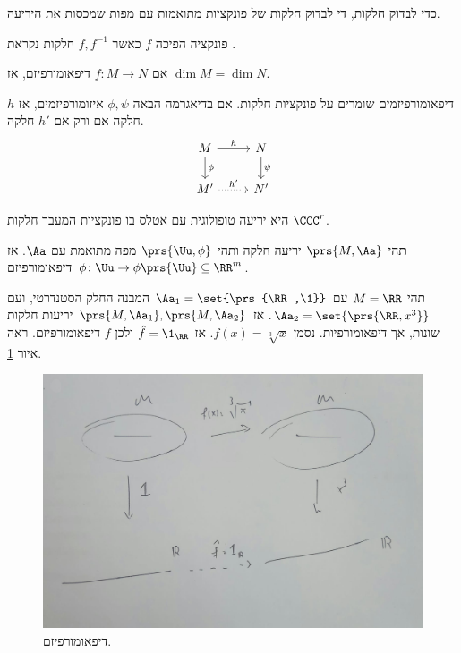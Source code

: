 \documentclass[a4paper,10pt,twoside,openany]{book}
\begin{document}
\begin{remark}
כדי לבדוק חלקות, די לבדוק חלקות של פונקציות מתואמות עם מפות שמכסות את היריעה.
\end{remark}
\begin{definition}
פונקציה הפיכה
$f$
כאשר
$f,f^{-1}$
חלקות נקראת
.
\end{definition}
\begin{exercise}
אם
$f \colon M \to N$
דיפאומורפיזם, אז
$\dim M = \dim N$.
\end{exercise}
\begin{exercise}
דיפאומורפיזמים שומרים על פונקציות חלקות.
אם בדיאגרמה הבאה
$\phi,\psi$
איזומורפיזמים, אז
$h$
חלקה אם ורק אם
$h'$
חלקה.
\[
\begin{tikzcd}
M \arrow[r,"h"] \arrow[d,"\phi"] & N \arrow[d,"\psi"] \\
M' \arrow[r, dotted, "h'"] & N'
\end{tikzcd}
\]
\end{exercise}
\begin{definition}
היא יריעה טופולוגית עם אטלס בו פונקציות המעבר חלקות
$\CCC^r$.
\end{definition}
\begin{exercise}
תהי
$\prs{M,\Aa}$
יריעה חלקה ותהי
$\prs{\Uu, \phi}$
מפה מתואמת עם
$\Aa$.
אז
$\phi \colon \Uu \to \phi\prs{\Uu} \subseteq \RR^m$
דיפאומורפיזם.
\end{exercise}
\begin{example}
תהי
$M = \RR$
עם
$\Aa_1 = \set{\prs{\RR,\1}}$
המבנה החלק הסטנדרטי, ועם
$\Aa_2 = \set{\prs{\RR,x^3}}$.
אז
$\prs{M,\Aa_1}, \prs{M,\Aa_2}$
יריעות חלקות שונות, אך דיפאומורפיות.
נסמן
$f(x) = \sqrt[3]{x}$.
אז
$\hat{f} = \1_{\RR}$
ולכן
$f$
דיפאומורפיזם. ראה איור
\ref{diffeo}.
\begin{figure}[h!]
\centering
\caption{דיפאומורפיזם.}
\label{diffeo}
\includegraphics[scale=0.6]{sources/diffeo}
\end{figure}
\end{example}
\end{document}
